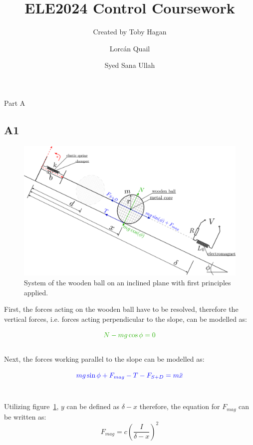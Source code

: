 \documentclass[a4paper,10pt,reqno]{amsart}
\title[ELE2024 Coursework]{\Huge ELE2024 Control Coursework}
\author[T. Hagan]{\Large Created by Toby Hagan}
\author[L. Quail]{\Large Lorcán Quail}
\author[S. Ullah]{\Large Syed Sana Ullah}
\makeatletter
\def\section{\@startsection{section}{1}%
  \z@{.7\linespacing\@plus\linespacing}{.5\linespacing}%
  {\bfseries\scshape\centering}}
\newenvironment{nouppercase}{%
  \let\uppercase\relax%
  \renewcommand{\uppercasenonmath}[1]{}}{}
\numberwithin{equation}{section}
\makeatother
\begin{document}
\begin{nouppercase}
\maketitle
\end{nouppercase}


\section{Part A}

\subsection{A1}\label{sec:A1}

\begin{figure}[h]
\label{fig:A1Diagram}
 \centering
 \includegraphics[width=0.6\linewidth]{Figures/FreeBody.eps}
 \caption{System of the wooden ball on an inclined plane with first principles applied.}
\end{figure}

\par First, the forces acting on the wooden ball have to be resolved, therefore the vertical forces, i.e. forces acting perpendicular to the slope, can be modelled as:

\begin{equation}
    \color{darkGreen}{N-mg\cos{\phi}=0}\color{black}
\end{equation}
\\
Next, the forces working parallel to the slope can be modelled as:

\begin{equation}
\label{eqn:ForcesOrg}
    \color{blue}{mg\sin{\phi}+F_{mag}-T-F_{S+D}=m\ddot{x}}\color{black}
\end{equation}
\\
\par Utilizing figure~\ref{fig:A1Diagram}, $y$ can be defined as $\delta-x$ therefore, the equation for $F_{mag}$ can be written as:
\begin{equation}
    F_{mag} = c(\frac{I}{\delta-x})^2
\end{equation}
\end{document}
